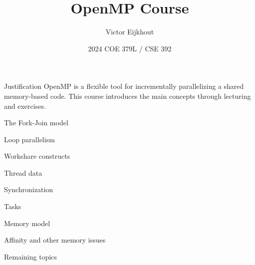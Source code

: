 \documentclass[10pt]{beamer}
\begin{document}


\author[Eijkhout]{Victor Eijkhout}
\date[2024]{2024 COE 379L / CSE 392}
\title[OMP]{OpenMP Course}
\maketitle

\begin{frame}{Justification}
  OpenMP is a flexible tool for incrementally parallelizing a shared
  memory-based code.
  This course introduces the main concepts
  through lecturing and exercises.
\end{frame}

 {The Fork-Join model}


 {Loop parallelism}


 {Workshare constructs}


 {Thread data}


 {Synchronization}


 {Tasks}


 {Memory model}


 {Affinity and other memory issues}


 {Remaining topics}

\end{document}
